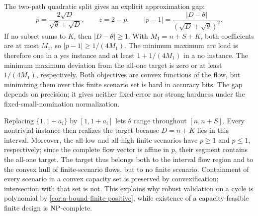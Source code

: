The two-path quadratic split gives an explicit approximation gap:
\[
 p=\frac{2\sqrt D}{\sqrt\theta+\sqrt D},\qquad z=2-p,
 \qquad |p-1|=\frac{|D-\theta|}{(\sqrt D+\sqrt\theta)^2}.
\]
If no subset sums to $K$, then $|D-\theta|\ge1$. With
$M_1=n+S+K$, both coefficients are at most $M_1$, so
$|p-1|\ge1/(4M_1)$. The minimum maximum arc load is therefore one
in a yes instance and at least $1+1/(4M_1)$ in a no instance.
The minimum maximum deviation from the all-one target is zero or at
least $1/(4M_1)$, respectively. Both objectives are convex functions of
the flow, but minimizing them over this finite scenario set is hard in
accuracy bits. The gap depends on precision; it gives neither
fixed-error nor strong hardness under the fixed-small-nomination
normalization.

Replacing $\{1,1+a_i\}$ by $[1,1+a_i]$ lets $\theta$ range throughout
$[n,n+S]$. Every nontrivial instance then realizes the target because
$D=n+K$ lies in this interval. Moreover, the all-low and all-high finite
scenarios have $p\ge1$ and $p\le1$, respectively; since the complete
flow vector is affine in $p$, their segment contains the all-one target.
The target thus belongs both to the interval flow region and to the
convex hull of finite-scenario flows, but to no finite scenario.
Containment of every scenario in a convex capacity set is preserved by
convexification; intersection with that set is not. This explains why
robust validation on a cycle is polynomial by
\cref{cor:a-bound-finite-positive}, while existence of a capacity-feasible
finite design is $\mathrm{NP}$-complete.
